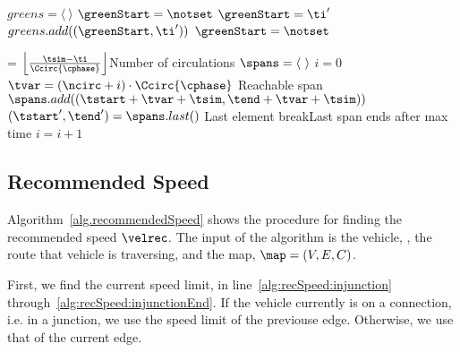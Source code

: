 \begin{algorithm}
\caption{$getSpans(\con, \ti)$}\label{alg.getSpans}
\begin{algorithmic}[1]
\State $greens = \langle\ \rangle$\label{alg:getSpans:initGreens}
\State $\greenStart = \notset$\label{alg:getSpans:initgreenS}
\label{alg:getSpans:GreensFor}
\label{alg:getSpans:GreenBegin}
\State $\greenStart = \ti'$\label{alg:getSpans:storet}
\label{alg:getSpans:GreenEnd}
\State $greens.add((\greenStart, \ti'))$\label{alg:getSpans:add}
\State $\greenStart=\notset$\label{alg:getSpans:resetnotset}
\EndIf
\EndFor\label{alg:getSpans:GreensEnd}

\State \ncirc = $\left \lfloor \frac{\tsim-\ti}{\Ccirc{\cphase}} \right \rfloor$\Comment Number of circulations\label{alg:getSpans:ncirc}
\State $\spans = \langle\ \rangle$\label{alg:getSpans:initSpans}
\State $i = 0$\label{alg:getSpans:i}
\label{alg:getSpans:whilebegin}
\label{alg:getSpans:forbegin}
\State $\tvar = (\ncirc+i)\cdot \Ccirc{\cphase}$\label{alg:getSpans:tvar}
\If {$\tend+\tvar> \tsim-\ti$}\Comment Reachable span\label{alg:getSpans:ifReachable}
\State $\spans.add((\tstart + \tvar+\tsim, \tend + \tvar+ \tsim))$\label{alg:getSpans:add}
\EndIf
\EndFor
\State $(\tstart',\tend') = \spans.last()$ \Comment Last element
\label{alg:getSpans:breakCond}
\State break\Comment Last span ends after max time
\EndIf
\State $i=i+1$\label{alg:getSpans:i++}
\EndWhile\label{alg:getSpans:endWhile}
\State\Return \spans
\end{algorithmic}
\end{algorithm}



\subsection{Recommended Speed}
Algorithm~\ref{alg.recommendedSpeed} shows the procedure for finding the recommended speed $\velrec$.
The input of the algorithm is the vehicle, \veh, the route that vehicle is traversing, \route and the map, $\map = (V, E, C)$.

First, we find the current speed limit, \velmax in line~\ref{alg:recSpeed:injunction} through~\ref{alg:recSpeed:injunctionEnd}. %
If the vehicle currently is on a connection, i.e. in a junction, we use the speed limit of the previouse edge.
Otherwise, we use that of the current edge.

